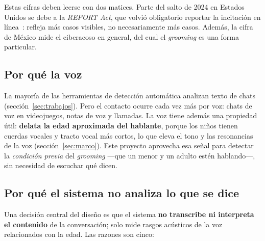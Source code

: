 \documentclass[11pt,a4paper]{article}
\newcommand{\gr}{\emph{grooming}}
\begin{document}
Estas cifras deben leerse con dos matices. Parte del salto de 2024 en Estados Unidos se debe a la \emph{REPORT Act}, que volvió obligatorio reportar la incitación en línea~\cite{thorn2025}: refleja más casos visibles, no necesariamente más casos. Además, la cifra de México mide el ciberacoso en general, del cual el \gr{} es una forma particular.

\subsection{Por qué la voz}

La mayoría de las herramientas de detección automática analizan texto de chats (sección~\ref{sec:trabajos}). Pero el contacto ocurre cada vez más por voz: chats de voz en videojuegos, notas de voz y llamadas. La voz tiene además una propiedad útil: \textbf{delata la edad aproximada del hablante}, porque los niños tienen cuerdas vocales y tracto vocal más cortos, lo que eleva el tono y las resonancias de la voz (sección~\ref{sec:marco}). Este proyecto aprovecha esa señal para detectar la \emph{condición previa} del \gr{} ---que un menor y un adulto estén hablando---, sin necesidad de escuchar qué dicen.

\subsection{Por qué el sistema no analiza lo que se dice}

Una decisión central del diseño es que el sistema \textbf{no transcribe ni interpreta el contenido} de la conversación; solo mide rasgos acústicos de la voz relacionados con la edad. Las razones son cinco:
\end{document}
